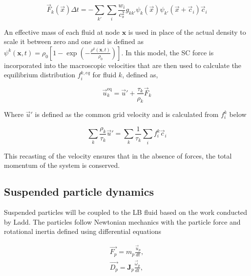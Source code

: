 \begin{equation}
\vec{F}_k(\vec{x}) \Delta t = - \sum_{k'} \sum_i \frac{w_i}{c_s^2} g_{kk'} \psi_k(\vec{x})\psi_{k'}(\vec{x}+\vec{c}_i) \vec{c}_i
\label{eq:sc_model}
\end{equation}

An effective mass of each fluid at node $\mathbf{x}$ is used in place of the actual density to scale it between zero 
and one and is defined as $\psi^{k}(\mathbf{x},t) = \rho_{0}\left[1 - \exp(-\frac{\rho^{k}(\mathbf{x}, t)}{\rho_{0}})\right]$. 
In this model, the SC force is incorporated into the macroscopic velocities that are then used to calculate the equilibrium
distribution $f_{i}^{k, eq}$ for fluid $k$, defined as,

\begin{equation}
\vec{u}_k^{\text{eq}} = \vec{u}' + \frac{\tau_k}{\rho_k} \vec{F}_k
\end{equation}

Where $\vec{u}'$ is defined as the common grid velocity and is calculated from $f_i^k$ below

\begin{equation}
    \sum_k \frac{\rho_k}{\tau_k} \vec{u}' = \sum_k \frac{1}{\tau_k}\sum_i f_i^k\vec{c}_i
\end{equation}

This recasting of the velocity ensures that in the absence of forces, the total momentum of the system is conserved. 


\subsection{Suspended particle dynamics}
\label{section:lbm_colloids}

Suspended particles will be coupled to the LB fluid based on the work conducted by Ladd. \cite{ladd_numerical_1994, 
aidun_direct_1998, ladd_lattice-boltzmann_2001} The particles follow Newtonian mechanics with the particle force and
rotational inertia defined using differential equations

\begin{equation}
    \begin{split}
    \vec{F_p} = m_p \frac{\vec{u}_p}{dt} , \\
    \vec{D_p} = \mathbf{J}_p \frac{\vec{\omega}_p}{dt} ,
    \label{eq:md}
    \end{split}
\end{equation}

